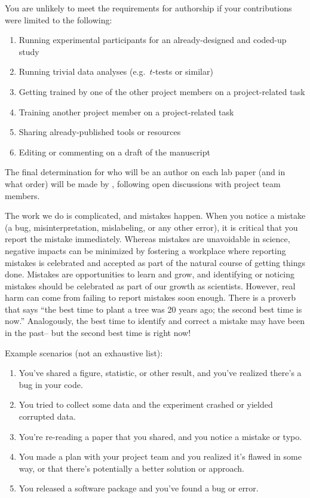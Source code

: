 \documentclass{tufte-book} %
\begin{document}
  You are unlikely to
meet the requirements for authorship if your contributions were
limited to the following:
\begin{enumerate}
  \item Running experimental participants for an already-designed and
    coded-up study
  \item Running trivial data analyses (e.g.\ $t$-tests or similar)
  \item Getting trained by one of the other project members on a
    project-related task
  \item Training another project member on a project-related task
  \item Sharing already-published tools or resources
  \item Editing or commenting on a draft of the manuscript
\end{enumerate}

The final determination for who will be an author on each lab paper
(and in what order) will be made by \director, following open
discussions with project team members.


\noindent The work we do is complicated, and mistakes happen.  When
you notice a mistake (a bug, misinterpretation, mislabeling, or any
other error), it is critical that you report the mistake immediately.
Whereas mistakes are unavoidable in science, negative impacts can be
minimized by fostering a workplace where reporting mistakes is
celebrated and accepted as part of the natural course of getting
things done.  Mistakes are opportunities to learn and grow, and
identifying or noticing mistakes should be celebrated as part of our
growth as scientists.  However, real harm can come from failing to
report mistakes soon enough.  There is a proverb that says ``the best
time to plant a tree was 20 years ago; the second best time is now.''
Analogously, the best time to identify and correct a mistake may have
been in the past-- but the second best time is right now!

Example scenarios (not an exhaustive list):
\begin{enumerate}
  \item You've shared a figure, statistic, or other result, and
    you've realized there's a bug in your code.
  \item You tried to collect some data and the experiment crashed or
    yielded corrupted data.
  \item You're re-reading a paper that you shared, and you notice a
    mistake or typo.
  \item You made a plan with your project team and you realized it's
    flawed in some way, or that there's potentially a better solution
    or approach.
  \item You released a software package and you've found a bug or error.
\end{enumerate}
\end{document}
